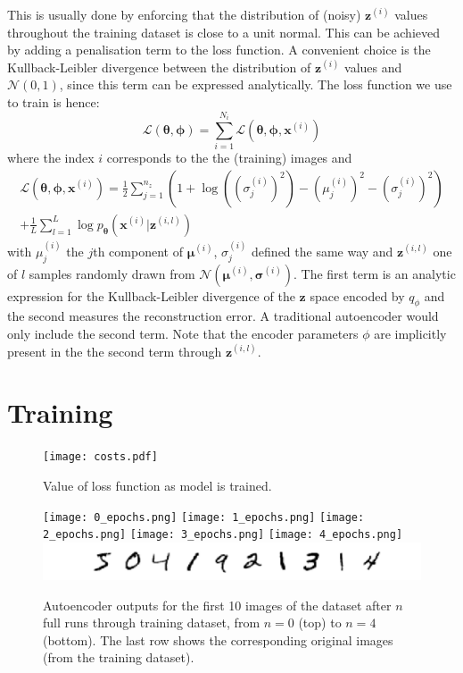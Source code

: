 \documentclass[]{article}
\begin{document}
This  is usually done by enforcing that the distribution of (noisy) $\bm{z}^{(i)}$ values throughout the training dataset is close to a unit normal. This can be achieved by adding a penalisation term to the loss function. A convenient choice is the Kullback-Leibler divergence between the distribution of $\bm{z}^{(i)}$ values and $\mathcal{N}(0, 1)$, since this term can be expressed analytically. The loss function we use to train is hence: 
\begin{equation}
  \mathcal{L}(\bm{\theta}, \bm{\phi}) = \sum_{i=1}^{N_i} \mathcal{L}(\bm{\theta}, \bm{\phi}, \bm{x}^{(i)})
\end{equation}
where the index $i$ corresponds to the the (training) images and
\begin{multline}
  \label{eq:loss}
  \mathcal{L}(\bm{\theta}, \bm{\phi}, \bm{x}^{(i)}) = \frac{1}{2} \sum_{j=1}^{n_z} \left( 1 + \log{((\sigma_j^{(i)})^2)} - (\mu_j^{(i)})^2 - (\sigma_j^{(i)})^2 \right) \\
  + \frac{1}{L} \sum_{l=1}^L \log{p_{\bm{\theta}}(\bm{x}^{(i)}|\bm{z}^{(i, l)})}
\end{multline}
with $\mu_j^{(i)}$ the $j$th component of $\bm{\mu}^{(i)}$, $\sigma_j^{(i)}$ defined the same way and $\bm{z}^{(i, l)}$ one of $l$ samples randomly drawn from $\mathcal{N}(\bm{\mu}^{(i)}, \bm{\sigma}^{(i)})$. The first term is an analytic expression for the Kullback-Leibler divergence of the $\bm{z}$ space encoded by $q_\phi$ and the second measures the reconstruction error. A traditional autoencoder would only include the second term. Note that the encoder parameters $\phi$ are implicitly present in the the second term through $\bm{z}^{(i, l)}$. 




\section{Training}
\label{sec:training}

\begin{figure}
  \centering
  \texttt{[image: costs.pdf]}
  \caption{Value of loss function as model is trained.}
  \label{fig:training_costs}
\end{figure}

\begin{figure}
  \centering
  \texttt{[image: 0\_epochs.png]}
  \texttt{[image: 1\_epochs.png]}
  \texttt{[image: 2\_epochs.png]}
  \texttt{[image: 3\_epochs.png]}
  \texttt{[image: 4\_epochs.png]}
  \includegraphics[scale=0.6, trim=82 0 0 0, clip]{benchmark.pdf}
  \caption{Autoencoder outputs for the first 10 images of the dataset after $n$ full runs through training dataset, from $n=0$ (top) to $n=4$ (bottom). The last row shows the corresponding original images (from the training dataset).}
  \label{fig:training_images}
\end{figure}
\end{document}
